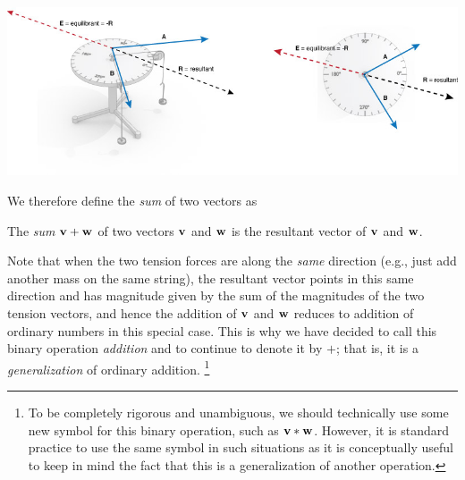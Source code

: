 \documentclass[12pt,letterpaper,reqno]{article}
\numberwithin{equation}{section}
\newcommand{\ti}[1]{\textit{#1}}
\begin{document}
\begin{center}
	\includegraphics[scale=0.5]{figures_mvc/force-table-equi-res}
\end{center}

 We therefore define the \ti{sum} of two vectors as  
 
 \begin{defn}
 	The \ti{sum} ${\bf v}+{\bf w}$ of two vectors ${\bf v}$ and ${\bf w}$ is the resultant vector of ${\bf v}$ and ${\bf w}$.
 \end{defn}
Note that when the two tension forces are along the \ti{same} direction (e.g., just add another mass on the same string), the resultant vector points in this same direction and has magnitude given by the sum of the magnitudes of the two tension vectors, and hence the addition of ${\bf v}$ and ${\bf w}$ reduces to addition of ordinary numbers in this special case. This is why we have decided to call this binary operation \ti{addition} and to continue to denote it by $+$; that is, it is a \ti{generalization} of ordinary addition. \footnote{To be completely rigorous and unambiguous, we should technically use some new symbol for this binary operation, such as ${\bf v}*{\bf w}$. However, it is standard practice to use the same symbol in such situations as it is conceptually useful to keep in mind the fact that this is a generalization of another operation.}
 
\end{document}

